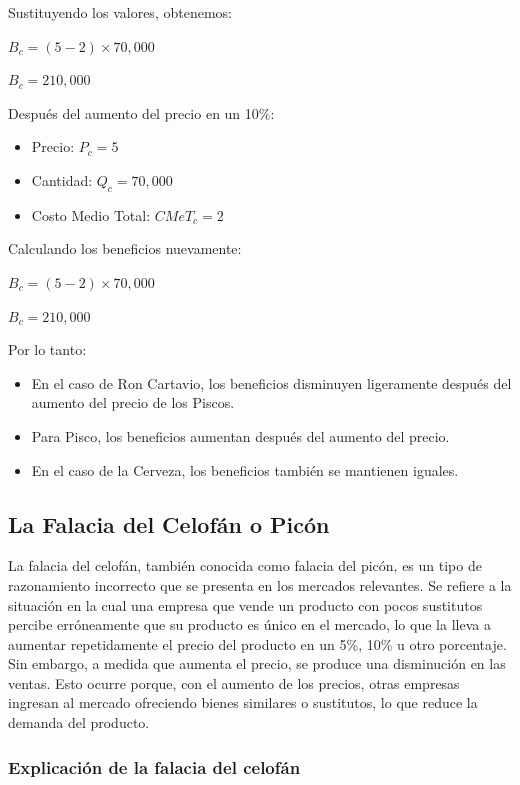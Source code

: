 \documentclass[
  doc,
  floatsintext,
  longtable,
  a4paper,
  nolmodern,
  notxfonts,
  notimes,
  12pt,
  colorlinks=true,linkcolor=blue,citecolor=blue,urlcolor=blue]{apa7}
\providecommand{\tightlist}{%
  \setlength{\itemsep}{0pt}\setlength{\parskip}{0pt}}
\begin{document}
Sustituyendo los valores, obtenemos:

\(B_c = (5 - 2) \times 70,000\)

\(B_c = 210,000\)

Después del aumento del precio en un 10\%:

\begin{itemize}
\tightlist
\item
  Precio: \(P_c = 5\)
\item
  Cantidad: \(Q_c = 70,000\)
\item
  Costo Medio Total: \(CMeT_c = 2\)
\end{itemize}

Calculando los beneficios nuevamente:

\(B_c = (5 - 2) \times 70,000\)

\(B_c = 210,000\)

Por lo tanto:

\begin{itemize}
\tightlist
\item
  En el caso de Ron Cartavio, los beneficios disminuyen ligeramente
  después del aumento del precio de los Piscos.
\item
  Para Pisco, los beneficios aumentan después del aumento del precio.
\item
  En el caso de la Cerveza, los beneficios también se mantienen iguales.
\end{itemize}

\subsection{La Falacia del Celofán o
Picón}\label{la-falacia-del-celofuxe1n-o-picuxf3n}

La falacia del celofán, también conocida como falacia del picón, es un
tipo de razonamiento incorrecto que se presenta en los mercados
relevantes. Se refiere a la situación en la cual una empresa que vende
un producto con pocos sustitutos percibe erróneamente que su producto es
único en el mercado, lo que la lleva a aumentar repetidamente el precio
del producto en un 5\%, 10\% u otro porcentaje. Sin embargo, a medida
que aumenta el precio, se produce una disminución en las ventas. Esto
ocurre porque, con el aumento de los precios, otras empresas ingresan al
mercado ofreciendo bienes similares o sustitutos, lo que reduce la
demanda del producto.

\subsubsection{Explicación de la falacia del
celofán}\label{explicaciuxf3n-de-la-falacia-del-celofuxe1n}
\end{document}
